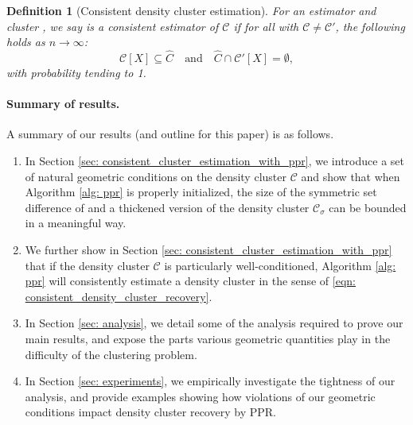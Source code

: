 \documentclass{article}
\newcommand{\1}{\mathbf{1}}
\newcommand{\Xbf}{X}             %
\newcommand{\Cbb}{\mathbb{C}}
\newcommand{\Cset}{\mathcal{C}}
\newcommand{\Csig}{\Cset_{\sigma}}
\newcommand{\Cest}{\widehat{C}}
\theoremstyle{aldenthm}
\newtheorem{definition}{Definition}
\theoremstyle{aldenrmrk}
\begin{document}
\begin{definition}[Consistent density cluster estimation]
  \label{def: consistent_density_cluster_estimation}
  For an estimator \smash{$\Cest \subseteq \Xbf$} and cluster 
  \smash{$\Cset \in \Cbb_f(\lambda)$}, we say \smash{$\Cest$} is a consistent 
  estimator of $\Cset$ if for all \smash{$\Cset' \in \Cbb_f(\lambda)$} with
  $\Cset \not= \Cset'$, the following holds as $n \to \infty$: 
  \begin{equation}
    \label{eqn: consistent_density_cluster_recovery}
    \Cset[\Xbf] \subseteq \Cest \quad \text{and} \quad
    \Cest \cap \Cset'[\Xbf] = \emptyset,
  \end{equation}
  with probability tending to 1.
\end{definition}

\paragraph{Summary of results.} A summary of our results (and outline for this
paper) is as follows.

\begin{enumerate}
\item In Section \ref{sec: consistent_cluster_estimation_with_ppr}, we introduce
  a set of natural geometric conditions on the density cluster $\Cset$
  and show that when Algorithm \ref{alg: ppr} is properly initialized, the size of
  the symmetric set difference of \smash{$\Cest$} and a thickened version of the
  density cluster $\Csig$ can be bounded in a meaningful way.
	
\item We further show in Section \ref{sec:
    consistent_cluster_estimation_with_ppr} that if the density cluster 
  $\Cset$ is particularly well-conditioned, Algorithm \ref{alg: ppr}
  will consistently estimate a density cluster in the sense of
  \eqref{eqn: consistent_density_cluster_recovery}. 
	
\item In Section \ref{sec: analysis}, we detail some of the analysis required to
  prove our main results, and expose the parts various geometric quantities play 
  in the difficulty of the clustering problem. 
	
\item In Section \ref{sec: experiments}, we empirically investigate the
  tightness of our analysis, and provide examples showing how violations of our
  geometric conditions impact density cluster recovery by PPR.
\end{enumerate}
\end{document}
